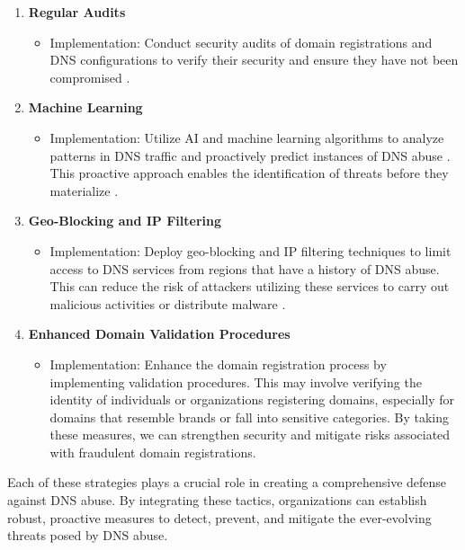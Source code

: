 \begin{enumerate}
\begin{itemize}
    \end{itemize}
    \item \textbf{Regular Audits}
    \begin{itemize}
        \item Implementation: Conduct security audits of domain registrations and DNS configurations to verify their security and ensure they have not been compromised \cite{coronado2014auditing}.
    \end{itemize}
    \item \textbf{Machine Learning}
    \begin{itemize}
        \item Implementation: Utilize AI and machine learning algorithms to analyze patterns in DNS traffic and proactively predict instances of DNS abuse \cite{icannndnssec}. This proactive approach enables the identification of threats before they materialize \cite{tsukerman2019machine}.
    \end{itemize}
    \item \textbf{Geo-Blocking and IP Filtering}
    \begin{itemize}
        \item Implementation: Deploy geo-blocking and IP filtering techniques to limit access to DNS services from regions that have a history of DNS abuse. This can reduce the risk of attackers utilizing these services to carry out malicious activities or distribute malware \cite{meeseedited}.
    \end{itemize}
    \item \textbf{Enhanced Domain Validation Procedures}
    \begin{itemize}
        \item Implementation: Enhance the domain registration process by implementing validation procedures. This may involve verifying the identity of individuals or organizations registering domains, especially for domains that resemble brands or fall into sensitive categories. By taking these measures, we can strengthen security and mitigate risks associated with fraudulent domain registrations.
    \end{itemize}
\end{enumerate}

Each of these strategies plays a crucial role in creating a comprehensive defense against DNS abuse. By integrating these tactics, organizations can establish robust, proactive measures to detect, prevent, and mitigate the ever-evolving threats posed by DNS abuse.

